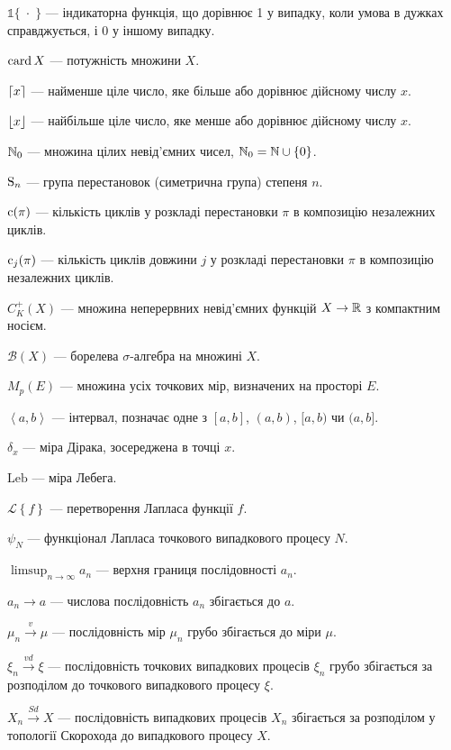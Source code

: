 $\mathds{1}\{\; \cdot\;\}$ --- індикаторна функція, що дорівнює 1 у випадку, коли умова в
дужках справджується, і 0 у іншому випадку.

$\card X$ --- потужність множини $X$. 

$\ceil*{x}$ --- найменше ціле число, яке більше або дорівнює дійсному числу $x$.%

$\floor*{x}$ --- найбільше ціле число, яке менше або дорівнює дійсному числу $x$.%

$\N_0$ --- множина цілих невід'ємних чисел, $\N_0 = \N \cup \{0\}$.

$\Sym{n}$ --- група перестановок (симетрична група) степеня $n$.

$\cycle({\pi})$ --- кількість циклів у розкладі перестановки $\pi$ в композицію
незалежних циклів.

$\cycle_j({\pi})$ --- кількість циклів довжини $j$ у розкладі перестановки $\pi$ в композицію
незалежних циклів.

$C_K^+(X)$ --- множина неперервних невід'ємних функцій
$X \to \R$ з компактним носієм.

$\mathcal{B}(X)$ --- борелева $\sigma$-алгебра на множині $X$.

$M_p(E)$ --- множина усіх точкових мір, визначених на просторі $E$.

$\left<a,b\right>$ --- інтервал, позначає одне з $[a, b]$, $(a, b)$, $[a, b)$ чи $(a, b]$.

$\delta_x$ --- міра Дірака, зосереджена в точці $x$.

$\mathrm{Leb}$ --- міра Лебега.

$\mathcal{L}\left\{f\right\}$ --- перетворення Лапласа функції $f$.

$\psi_N$ --- функціонал Лапласа точкового випадкового процесу $N$.

$\limsup_{n\to\infty} a_n$ --- верхня границя послідовності $a_n$.

$a_n \to a$ --- числова послідовність $a_n$ збігається до $a$.

$\mu_n \overset{v}{\longrightarrow} \mu$ --- послідовність мір $\mu_n$
грубо збігається до міри $\mu$.

$\xi_n \overset{vd}{\longrightarrow} \xi$ --- послідовність точкових випадкових процесів $\xi_n$
грубо збігається за розподілом до точкового випадкового процесу $\xi$.

$X_n \overset{Sd}{\longrightarrow} X$ --- послідовність випадкових процесів $X_n$
збігається за розподілом у топології Скорохода до випадкового процесу $X$.


